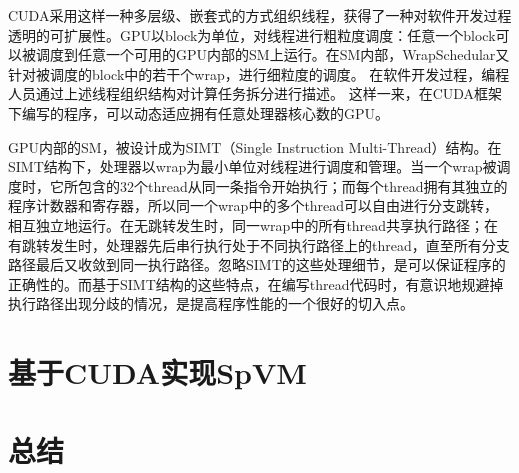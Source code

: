 \documentclass[11pt,twocolumn]{article}
\begin{document}
CUDA采用这样一种多层级、嵌套式的方式组织线程，获得了一种对软件开发过程透明的可扩展性。GPU以block为单位，对线程进行粗粒度调度：任意一个block可以被调度到任意一个可用的GPU内部的SM上运行。在SM内部，WrapSchedular又针对被调度的block中的若干个wrap，进行细粒度的调度。
在软件开发过程，编程人员通过上述线程组织结构对计算任务拆分进行描述。
这样一来，在CUDA框架下编写的程序，可以动态适应拥有任意处理器核心数的GPU。

GPU内部的SM，被设计成为SIMT（Single Instruction Multi-Thread）结构。在SIMT结构下，处理器以wrap为最小单位对线程进行调度和管理。当一个wrap被调度时，它所包含的32个thread从同一条指令开始执行；而每个thread拥有其独立的程序计数器和寄存器，所以同一个wrap中的多个thread可以自由进行分支跳转，相互独立地运行。在无跳转发生时，同一wrap中的所有thread共享执行路径；在有跳转发生时，处理器先后串行执行处于不同执行路径上的thread，直至所有分支路径最后又收敛到同一执行路径。忽略SIMT的这些处理细节，是可以保证程序的正确性的。而基于SIMT结构的这些特点，在编写thread代码时，有意识地规避掉执行路径出现分歧的情况，是提高程序性能的一个很好的切入点。


\section{基于CUDA实现SpVM}
\section{总结}

\renewcommand\refname{引用}

{}
\end{document}
